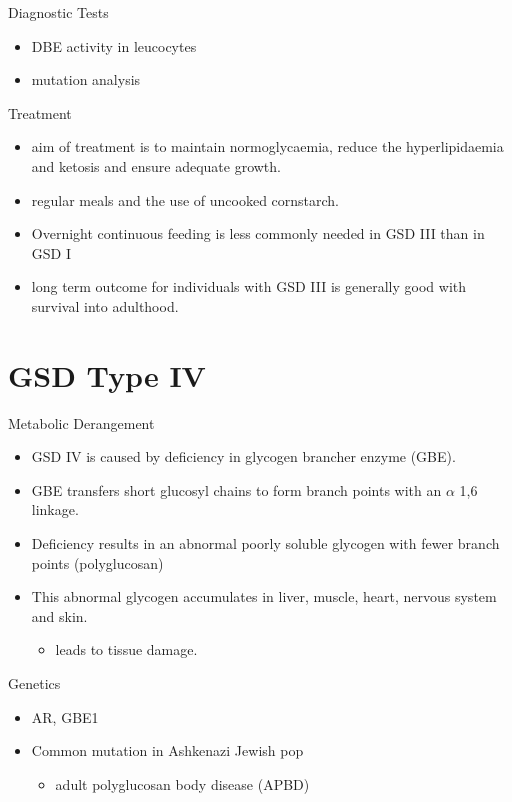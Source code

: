 \documentclass[presentation, smaller]{beamer}
\begin{document}
\begin{frame}[label={sec:orgeea5139}]{Diagnostic Tests}
\begin{itemize}
\item DBE activity in leucocytes
\item mutation analysis
\end{itemize}
\end{frame}
\begin{frame}[label={sec:orgee5e17a}]{Treatment}
\begin{itemize}
\item aim of treatment is to maintain normoglycaemia, reduce the
hyperlipidaemia and ketosis and ensure adequate growth.
\item regular meals and the use of uncooked cornstarch.
\item Overnight continuous feeding is less commonly needed in GSD III than
in GSD I
\item long term outcome for individuals with GSD III is generally good
with survival into adulthood.
\end{itemize}
\end{frame}
\section{GSD Type IV}
\label{sec:org96b6d4e}
\begin{frame}[label={sec:org21cc8dd}]{Metabolic Derangement}
\begin{itemize}
\item GSD IV is caused by deficiency in glycogen brancher enzyme (GBE).
\item GBE transfers short glucosyl chains to form branch points with an
\(\alpha\) 1,6 linkage.
\item Deficiency results in an abnormal poorly soluble glycogen with fewer branch points (polyglucosan)
\item This abnormal glycogen accumulates in liver, muscle, heart, nervous system and skin.
\begin{itemize}
\item leads to tissue damage.
\end{itemize}
\end{itemize}
\end{frame}

\begin{frame}[label={sec:orgf1bf960}]{Genetics}
\begin{itemize}
\item AR, GBE1
\item Common mutation in Ashkenazi Jewish pop
\begin{itemize}
\item adult polyglucosan body disease (APBD)
\end{itemize}
\end{itemize}
\end{frame}
\end{document}
